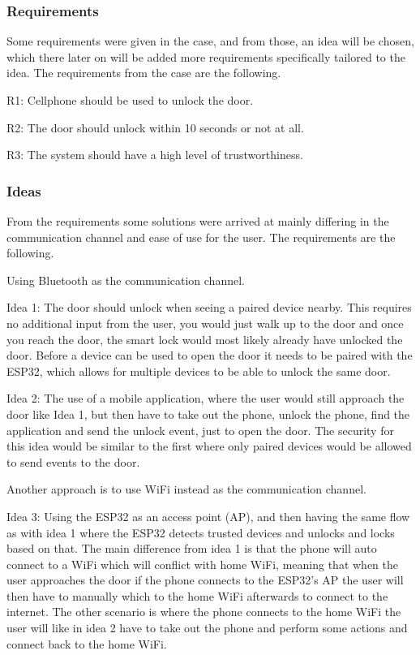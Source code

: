 \subsubsection{Requirements}
Some requirements were given in the case, and from those, an idea will be chosen, which there later on will be added more requirements specifically tailored to the idea.
The requirements from the case are the following.
\newline

R1: Cellphone should be used to unlock the door.

R2: The door should unlock within 10 seconds or not at all.

R3: The system should have a high level of trustworthiness.

\subsubsection{Ideas}
From the requirements some solutions were arrived at mainly differing in the communication channel and ease of use for the user.
The requirements are the following.

Using Bluetooth as the communication channel.

Idea 1: The door should unlock when seeing a paired device nearby.
This requires no additional input from the user, you would just walk up to the door and once you reach the door, the smart lock would most likely already have unlocked the door.
Before a device can be used to open the door it needs to be paired with the ESP32, which allows for multiple devices to be able to unlock the same door.

Idea 2: The use of a mobile application, where the user would still approach the door like Idea 1, but then have to take out the phone, unlock the phone, find the application and send the unlock event, just to open the door.
The security for this idea would be similar to the first where only paired devices would be allowed to send events to the door.

Another approach is to use WiFi instead as the communication channel.

Idea 3: Using the ESP32 as an access point (AP), and then having the same flow as with idea 1 where the ESP32 detects trusted devices and unlocks and locks based on that.
The main difference from idea 1 is that the phone will auto connect to a WiFi which will conflict with home WiFi, meaning that when the user approaches the door if the phone connects to the ESP32’s AP the user will then have to manually which to the home WiFi afterwards to connect to the internet.
The other scenario is where the phone connects to the home WiFi the user will like in idea 2 have to take out the phone and perform some actions and connect back to the home WiFi.

